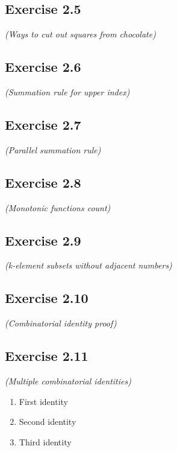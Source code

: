 \documentclass[12pt,a4paper]{article}
\begin{document}
\subsection*{Exercise 2.5}
\textit{(Ways to cut out  squares from  chocolate)}

\vspace{1cm}

\subsection*{Exercise 2.6}
\textit{(Summation rule for upper index)}

\vspace{1cm}

\subsection*{Exercise 2.7}
\textit{(Parallel summation rule)}

\vspace{1cm}

\subsection*{Exercise 2.8}
\textit{(Monotonic functions count)}

\vspace{1cm}

\subsection*{Exercise 2.9}
\textit{(k-element subsets without adjacent numbers)}

\vspace{1cm}

\subsection*{Exercise 2.10}
\textit{(Combinatorial identity proof)}

\vspace{1cm}

\subsection*{Exercise 2.11}
\textit{(Multiple combinatorial identities)}

\begin{enumerate}[label=(\alph*)]
\item First identity
\vspace{1cm}

\item Second identity
\vspace{1cm}

\item Third identity
\vspace{1cm}
\end{enumerate}
\end{document}
